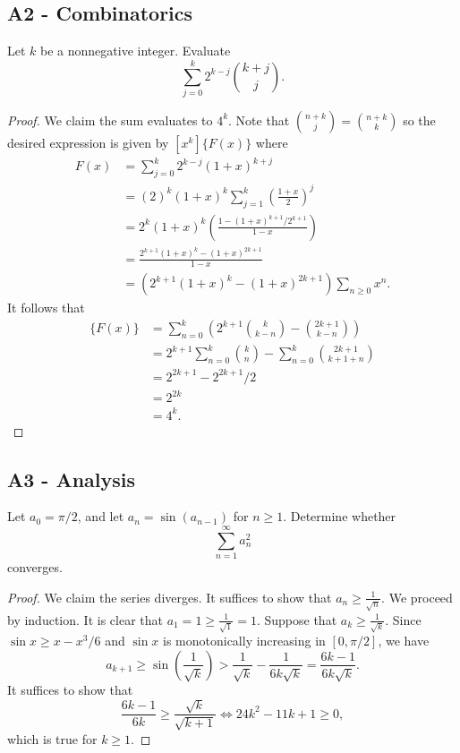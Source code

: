 \documentclass[11pt]{scrartcl}
\newcommand{\<}{\langle}
\renewcommand{\>}{\rangle}
\begin{document}
\subsection{A2 - Combinatorics}
Let $k$ be a nonnegative integer. Evaluate
\[ \sum_{j=0}^k 2^{k-j} \binom{k+j}{j}. \]
\begin{proof}
We claim the sum evaluates to $4^k$.  Note that $\binom{n + k}{j} = \binom{n + k}{k}$ so the desired expression is given by $[x^k]\{F(x)\}$ where 
\begin{align*}
F(x) &= \sum_{j=0}^k 2^{k-j} (1 + x)^{k + j} \\
&= (2)^k(1 + x)^k \sum_{j=1}^k \left (\frac{1 + x}{2} \right)^j \\
&= 2^k(1 + x)^k \left (\frac{1 - (1+x)^{k + 1}/2^{k + 1}}{1 - x} \right) \\
&= \frac{2^{k + 1}(1 + x)^k - (1 + x)^{2k + 1}}{1-x} \\
&= (2^{k + 1}(1 + x)^k - (1 + x)^{2k + 1}) \sum_{n \ge 0} x^n.
\end{align*}
It follows that 
\begin{align*}
[x^k]\{F(x)\} &=  \sum_{n=0}^k \left ( 2^{k + 1} \binom{k}{k-n} - \binom{2k + 1}{k-n}\right)\\
&= 2^{k + 1}\sum_{n=0}^k \binom{k}{n} - \sum_{n=0}^k \binom{2k + 1}{ k +1 + n} \\
&= 2^{2k+1} - 2^{2k+1}/2 \\
&= 2^{2k} \\
&= 4^k.
\end{align*}
\end{proof}

\pagebreak
\subsection{A3 - Analysis}
	Let $a_0=\pi /2$, and let $a_n=\sin (a_{n-1})$ for $n\ge 1$. Determine whether
\[ \sum_{n=1}^{\infty}a_n^2 \]converges.
\begin{proof}
We claim the series diverges.   It suffices to show that $a_n \ge \frac{1}{\sqrt{n}}$. We proceed by induction.  It is clear that $a_1 = 1 \ge \frac{1}{\sqrt{1}} = 1$.  Suppose that $a_k \ge \frac{1}{\sqrt{k}}$.  Since $\sin x \ge x - x^3 / 6$ and $\sin x$ is monotonically increasing in $[0, \pi/2]$, we have 
$$a_{k + 1} \ge \sin \left (\frac{1}{\sqrt{k}} \right) > \frac{1}{\sqrt{k}} - \frac{1}{6k\sqrt{k}} = \frac{6k-1}{6k\sqrt{k}}.$$
It suffices to show that 
$$\frac{6k-1}{6k} \ge \frac{\sqrt{k}}{\sqrt{k + 1}} \Leftrightarrow 24k^2 - 11k + 1 \ge 0,$$
which is true for $k \ge 1$.
\end{proof}
\pagebreak
\end{document}
